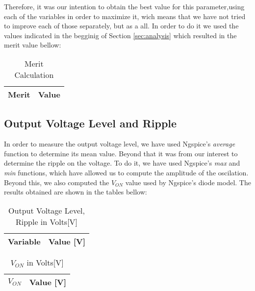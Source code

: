 Therefore, it was our intention to obtain the best value for this parameter,using each of the variables in order to maximize it, wich means that we have not tried to improve each of those separately, but as a all.
In order to do it we used the values indicated in the begginig of Section \ref{sec:analysis} which resulted in the merit value bellow:

\begin{table}[H]
  \centering
  \begin{tabular}{ | m{11cm} | m{3cm}| } 
    \hline    
    {\bf Merit} & {\bf Value} \\ \hline
    
  \end{tabular}
  \caption{Merit Calculation}
  \label{tab:merit}
\end{table}




\subsection{Output Voltage Level and Ripple}
\label{subsec:out_voltage}
In order to measure the output voltage level, we have used Ngspice's \textit{average} function to determine its mean value. Beyond that it was from our interest to determine the ripple on the voltage. To do it, we have used Ngspice's \textit{max} and \textit{min} functions, which have allowed us to compute the amplitude of the oscilation. Beyond this, we also computed the $V_{ON}$ value used by Ngspice's diode model. The results obtained are shown in the tables bellow:


\begin{table}[H]
  \centering
  \begin{tabular}{|l|r|}
    \hline    
    {\bf Variable} & {\bf Value [V]} \\ \hline
    
  \end{tabular}
  \caption{Output Voltage Level, Ripple in Volts[V]}
  \label{tab:out_voltage}
\end{table}


\begin{table}[H]
  \centering
  \begin{tabular}{|l|r|}
    \hline    
    {\bf $V_{ON}$} & {\bf Value [V]} \\ \hline
    
  \end{tabular}
  \caption{$V_{ON}$ in Volts[V]}
  \label{tab:v_on}
\end{table}


